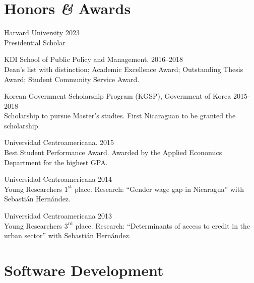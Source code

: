 \documentclass[a4paper, 10pt]{article}
\renewenvironment{itemize}{
  \begin{list}{}
    { \setlength{\itemsep}{5pt}
      \setlength{\parsep}{0pt}
      \setlength{\topsep}{0pt}
      \setlength{\leftmargin}{0em} } }{
  \end{list}}
\begin{document}
\section*{Honors \textit{\&} Awards}
\begin{itemize}
\item Harvard University \hfill 2023 \\ {\small Presidential Scholar}
\item KDI School of Public Policy and Management. \hfill 2016--2018 \\ {\small Dean's list with distinction; Academic Excellence Award; Outstanding Thesis Award; Student Community Service Award.}
\item Korean Government Scholarship Program (KGSP), Government of Korea \hfill 2015-2018 \\ {\small Scholarship to pursue Master's studies. First Nicaraguan to be granted the scholarship.}
\item Universidad Centroamericana. \hfill 2015 \\ {\small  Best Student Performance Award. Awarded by the Applied Economics Department for the highest GPA.}
\item Universidad Centroamericana \hfill 2014 \\ {\small Young Researchers $1^{\textrm{st}}$ place. Research: ``Gender wage gap in Nicaragua'' with Sebastián Hernández.}
\item Universidad Centroamericana \hfill 2013 \\ {\small Young Researchers $3^{\textrm{rd}}$ place. Research: ``Determinants of access to credit in the urban sector'' with Sebastián Hernández. }
\end{itemize}


\section*{Software Development}
\end{document}
